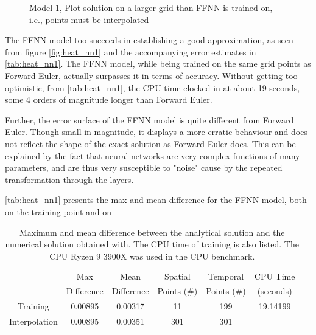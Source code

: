 \begin{figure}[H]
\qquad
{}
\caption{Model 1, Plot solution on a larger grid than FFNN is trained on, i.e., points must be interpolated}
\label{fig:heat_nn1}
\end{figure}

The FFNN model too succeeds in establishing a good approximation, as seen from figure \autoref{fig:heat_nn1} and the accompanying error estimates in \autoref{tab:heat_nn1}. The FFNN model, while being trained on the same grid points as Forward Euler, actually surpasses
it in terms of accuracy. Without getting too optimistic, from \autoref{tab:heat_nn1}, the CPU time clocked in at about 19 seconds, some 4 orders of magnitude longer than Forward Euler.

Further, the error surface of the FFNN model is quite different from Forward Euler. Though small in magnitude, it displays a more erratic behaviour and does not reflect the shape of the exact solution as Forward Euler does. This can be explained by the fact that neural networks are very complex functions of many parameters, and are thus very susceptible to "noise" cause by the repeated transformation through the layers.

\autoref{tab:heat_nn1} presents the max and mean difference for the FFNN model, both on the training point and on 

\begin{table}[H]
\caption{Maximum and mean difference between the analytical solution and the numerical solution obtained with. The CPU time of training is also listed. The CPU Ryzen 9 3900X was used in the CPU benchmark.}
\centering
{}
\begin{tabular}{cccccc}
\hline
\hline 
& Max & Mean & Spatial & Temporal & CPU Time
\\
& Difference & Difference & Points (\#) & Points (\#) & (seconds)
\\
\hline 
\hline 
Training & 0.00895 & 0.00317 & 11 & 199 & 19.14199
\\
Interpolation & 0.00895 & 0.00351 & 301 & 301 &
\\
\hline
\hline
\end{tabular}
\label{tab:heat_nn1}
\end{table}




